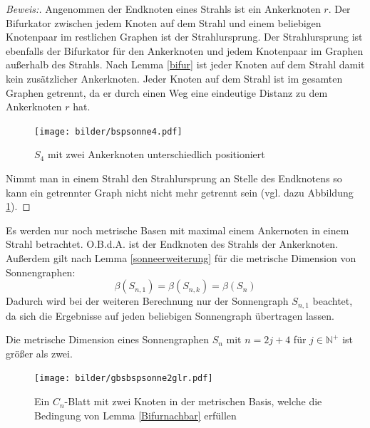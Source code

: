 \begin{proof}[Beweis:]
Angenommen der Endknoten eines Strahls ist ein Ankerknoten $r$. Der Bifurkator zwischen jedem Knoten auf dem Strahl und einem beliebigen Knotenpaar im restlichen Graphen ist der Strahlursprung. Der Strahlursprung ist ebenfalls der Bifurkator für den Ankerknoten und jedem Knotenpaar im Graphen außerhalb des Strahls. Nach Lemma \ref{bifur} ist jeder Knoten auf dem Strahl damit kein zusätzlicher Ankerknoten. Jeder Knoten auf dem Strahl ist im gesamten Graphen getrennt, da er durch einen Weg eine eindeutige Distanz zu dem Ankerknoten $r$ hat.\begin{figure}[h!]
		\centering
 		 \texttt{[image: bilder/bspsonne4.pdf]}
   \caption{$S_4$ mit zwei Ankerknoten unterschiedlich positioniert}
   \label{s4}
   \end{figure}
Nimmt man in einem Strahl den Strahlursprung an Stelle des Endknotens so kann ein getrennter Graph nicht nicht mehr getrennt sein (vgl. dazu Abbildung \ref{s4}).
\end{proof}
\begin{bem}
Es werden nur noch metrische Basen mit maximal einem Ankernoten in einem Strahl betrachtet. O.B.d.A. ist der Endknoten des Strahls der Ankerknoten. Außerdem gilt nach Lemma \ref{sonneerweiterung} für die metrische Dimension von Sonnengraphen: $$\beta(S_{n,1})=\beta(S_{n,k})=\beta(S_n)$$
Dadurch wird bei der weiteren Berechnung nur der Sonnengraph $S_{n,1}$ beachtet, da sich die Ergebnisse auf jeden beliebigen Sonnengraph übertragen lassen. 
\end{bem}
\begin{lem}
\label{mdgr2}
Die metrische Dimension eines Sonnengraphen $S_{n}$ mit $n = 2j+4$ für $j \in \mathbb{N}^+$ ist größer als zwei. 
\end{lem}
\vspace{-8mm}
 \begin{figure}[h!]
		\centering
 		 \texttt{[image: bilder/gbsbspsonne2glr.pdf]}
   \caption{Ein $C_{n}$-Blatt mit zwei Knoten in der metrischen Basis, welche die Bedingung von Lemma \ref{Bifurnachbar} erfüllen}
  	 \end{figure}
\vspace{-4mm}
  	 ~\linebreak

